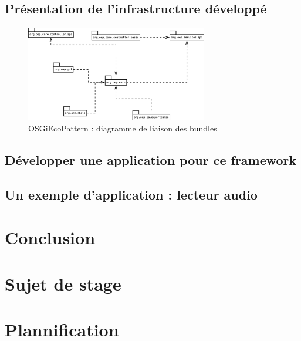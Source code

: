 \documentclass[a4paper, 11pt]{report}
\begin{document}
	\section{Présentation de l'infrastructure développé}
\begin{figure}
	\begin{center}
		\includegraphics[width=300px]{figures/EcoPattern_Bundle_Diagramme.eps}
		\caption{OSGiEcoPattern : diagramme de liaison des bundles}
	\end{center}
\end{figure}
	\section{Développer une application pour ce framework}
	\section{Un exemple d'application : lecteur audio}

\chapter{Conclusion}



\listoffigures{}
\listoftables{}
\appendix

\chapter{Sujet de stage}


\chapter{Plannification}
\end{document}
